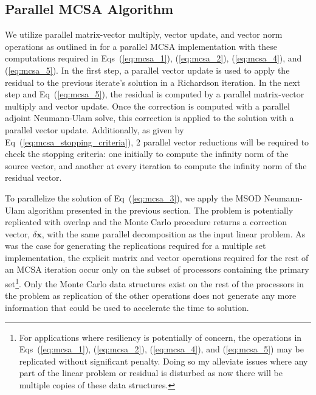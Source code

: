\documentclass{snamc2013}
\begin{document}
\subsection{Parallel MCSA Algorithm}
We utilize parallel matrix-vector multiply, vector update, and vector
norm operations as outlined in \cite{saad_iterative_2003} for a
parallel MCSA implementation with these computations required in
Eqs~(\ref{eq:mcsa_1}), (\ref{eq:mcsa_2}), (\ref{eq:mcsa_4}), and
(\ref{eq:mcsa_5}). In the first step, a parallel vector update is used
to apply the residual to the previous iterate's solution in a
Richardson iteration. In the next step and Eq~(\ref{eq:mcsa_5}), the
residual is computed by a parallel matrix-vector multiply and vector
update. Once the correction is computed with a parallel adjoint
Neumann-Ulam solve, this correction is applied to the solution with a
parallel vector update. Additionally, as given by
Eq~(\ref{eq:mcsa_stopping_criteria}), 2 parallel vector reductions
will be required to check the stopping criteria: one initially to
compute the infinity norm of the source vector, and another at every
iteration to compute the infinity norm of the residual vector.

To parallelize the solution of Eq~(\ref{eq:mcsa_3}), we apply the
MSOD Neumann-Ulam algorithm presented in the previous section. The
problem is potentially replicated with overlap and the Monte Carlo
procedure returns a correction vector, $\delta \mathbf{x}$, with the same
parallel decomposition as the input linear problem. As was the case
for generating the replications required for a multiple set
implementation, the explicit matrix and vector operations required for
the rest of an MCSA iteration occur only on the subset of processors
containing the primary set\footnote{For applications where resiliency
  is potentially of concern, the operations in Eqs~(\ref{eq:mcsa_1}),
  (\ref{eq:mcsa_2}), (\ref{eq:mcsa_4}), and (\ref{eq:mcsa_5}) may
  be replicated without significant penalty. Doing so my alleviate
  issues where any part of the linear problem or residual is disturbed
  as now there will be multiple copies of these data
  structures.}. Only the Monte Carlo data structures exist on the rest
of the processors in the problem as replication of the other
operations does not generate any more information that could be used
to accelerate the time to solution.

\end{document}

